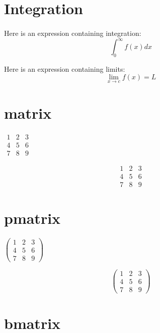 \documentclass{article}
\begin{document}
	\section{Integration}
	\paragraph{}
	Here is an expression containing integration:
	\[\int_{0}^{\infty}f(x)dx\]
	
	Here is an expression containing limits:
	\[\lim_{x\to c}f(x)=L\]
	
	\section{matrix}
	\paragraph{}
	$
	\begin{matrix}
		1 & 2 & 3\\
		4 & 5 & 6\\
		7 & 8 & 9
	\end{matrix}
$

\[
\begin{matrix}
	1&2&3\\
	4&5&6\\
	7&8&9
\end{matrix}\]

\section{pmatrix}
\paragraph{}

$\begin{pmatrix}
	1&2&3\\
	4&5&6\\
	7&8&9
\end{pmatrix}
$

\[
\begin{pmatrix}
	1&2&3\\
	4&5&6\\
	7&8&9
\end{pmatrix}
\]

\section{bmatrix}
\paragraph{}
\end{document}
